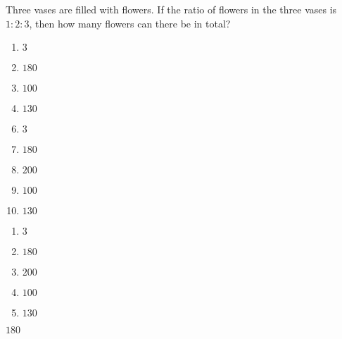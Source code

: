 


  Three vases are filled with flowers.  If the ratio of flowers in the three vases is $1:2:3$, then how many flowers can there be in total?


\ifsat
	\begin{enumerate}[label=\Alph*)]
		\item  $3$
		\item  $180$%
		\item  $100$
		\item  $130$
	\end{enumerate}
\else
\fi

\ifacteven
	\begin{enumerate}[label=\textbf{\Alph*.},itemsep=\fill,align=left]
		\setcounter{enumii}{5}
		\item  $3$
		\item  $180$%
		\item  $200$  
		\addtocounter{enumii}{1}
		\item  $100$
		\item  $130$
	\end{enumerate}
\else
\fi

\ifactodd
	\begin{enumerate}[label=\textbf{\Alph*.},itemsep=\fill,align=left]
		\item  $3$
		\item  $180$%
		\item  $200$  
		\item  $100$
		\item  $130$
	\end{enumerate}
\else
\fi

\ifgridin
  $180$%
		
\else
\fi

